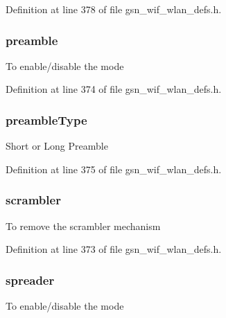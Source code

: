 Definition at line 378 of file gsn\_\-wif\_\-wlan\_\-defs.h.

\hypertarget{a00190_a4e1f59dc2cd10b195a57cab357e42ff6}{
\subsubsection[{preamble}]{ {\bf preamble}}}
\label{a00190_a4e1f59dc2cd10b195a57cab357e42ff6}
To enable/disable the mode 

Definition at line 374 of file gsn\_\-wif\_\-wlan\_\-defs.h.

\hypertarget{a00190_a1af7a22bf7a18ef09da23ae8d0e08d22}{
\subsubsection[{preambleType}]{ {\bf preambleType}}}
\label{a00190_a1af7a22bf7a18ef09da23ae8d0e08d22}
Short or Long Preamble 

Definition at line 375 of file gsn\_\-wif\_\-wlan\_\-defs.h.

\hypertarget{a00190_a808943286ddbb9bc1773a11a1f2c7cb3}{
\subsubsection[{scrambler}]{ {\bf scrambler}}}
\label{a00190_a808943286ddbb9bc1773a11a1f2c7cb3}
To remove the scrambler mechanism 

Definition at line 373 of file gsn\_\-wif\_\-wlan\_\-defs.h.

\hypertarget{a00190_a143ba26831a37e201c67c2ccb165bf56}{
\subsubsection[{spreader}]{ {\bf spreader}}}
\label{a00190_a143ba26831a37e201c67c2ccb165bf56}
To enable/disable the mode 


